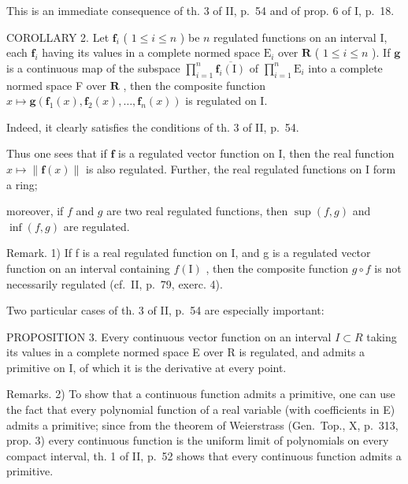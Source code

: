 This is an immediate consequence of th. 3 of II, p.~54 and of prop. 6 of I, p.~18.

COROLLARY 2. Let \(\mathbf{f}_i\) ( \(1 \leqslant i \leqslant n\) ) be \(n\) regulated functions on an interval I, each \(\mathbf{f}_i\) having its values in a complete normed space \(\mathrm{E}_i\) over \(\mathbf{R}\) ( \(1 \leqslant i \leqslant n\) ). If \(\mathbf{g}\) is a continuous map of the subspace \(\prod_{i=1}^{n} \overline{\mathbf{f}_i(\mathrm{I})}\) of \(\prod_{i=1}^{n} \mathrm{E}_i\) into a complete normed space F over \(\mathbf{R}\) , then the composite function \(x \mapsto \mathbf{g}(\mathbf{f}_1(x), \mathbf{f}_2(x), \ldots, \mathbf{f}_n(x))\) is regulated on I.

Indeed, it clearly satisfies the conditions of th. 3 of II, p.~54.

Thus one sees that if \(\mathbf{f}\) is a regulated vector function on I, then the real function \(x\mapsto \| \mathbf{f}(x)\|\) is also regulated. Further, the real regulated functions on I form a ring;

moreover, if \(f\) and \(g\) are two real regulated functions, then \(\sup(f, g)\) and \(\inf(f, g)\) are regulated.

Remark. 1) If f is a real regulated function on I, and g is a regulated vector function on an interval containing \(f(\mathrm{I})\) , then the composite function \(g \circ f\) is not necessarily regulated (cf.~II, p.~79, exerc. 4).

Two particular cases of th. 3 of II, p.~54 are especially important:

PROPOSITION 3. Every continuous vector function on an interval \(I \subset R\) taking its values in a complete normed space E over R is regulated, and admits a primitive on I, of which it is the derivative at every point.

Remarks. 2) To show that a continuous function admits a primitive, one can use the fact that every polynomial function of a real variable (with coefficients in E) admits a primitive; since from the theorem of Weierstrass (Gen.~Top., X, p.~313, prop. 3) every continuous function is the uniform limit of polynomials on every compact interval, th. 1 of II, p.~52 shows that every continuous function admits a primitive.

